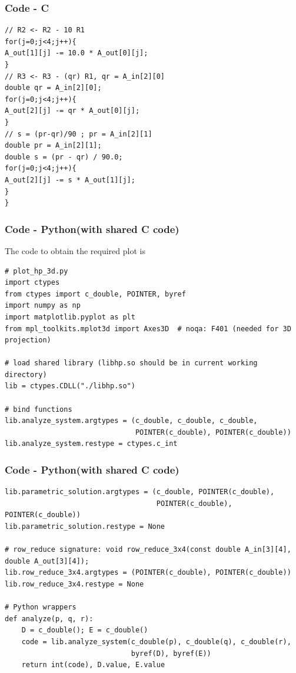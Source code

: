 \documentclass{beamer}
\theoremstyle{remark}
\numberwithin{equation}{section}
\begin{document}
    \begin{frame}[fragile]
    \frametitle{Code - C}
    \begin{lstlisting}
// R2 <- R2 - 10 R1
for(j=0;j<4;j++){
A_out[1][j] -= 10.0 * A_out[0][j];
}
// R3 <- R3 - (qr) R1, qr = A_in[2][0]
double qr = A_in[2][0];
for(j=0;j<4;j++){
A_out[2][j] -= qr * A_out[0][j];
}
// s = (pr-qr)/90 ; pr = A_in[2][1]
double pr = A_in[2][1];
double s = (pr - qr) / 90.0;
for(j=0;j<4;j++){
A_out[2][j] -= s * A_out[1][j];
}
}

\end{lstlisting}
\end{frame}

\begin{frame}[fragile]
    \frametitle{Code - Python(with shared C code)}
    The code to obtain the required plot is
    \begin{lstlisting}
# plot_hp_3d.py
import ctypes
from ctypes import c_double, POINTER, byref
import numpy as np
import matplotlib.pyplot as plt
from mpl_toolkits.mplot3d import Axes3D  # noqa: F401 (needed for 3D projection)

# load shared library (libhp.so should be in current working directory)
lib = ctypes.CDLL("./libhp.so")

# bind functions
lib.analyze_system.argtypes = (c_double, c_double, c_double,
                               POINTER(c_double), POINTER(c_double))
lib.analyze_system.restype = ctypes.c_int

\end{lstlisting}
\end{frame}
\begin{frame}[fragile]
\frametitle{Code - Python(with shared C code)}
\begin{lstlisting}
lib.parametric_solution.argtypes = (c_double, POINTER(c_double),
                                    POINTER(c_double), POINTER(c_double))
lib.parametric_solution.restype = None

# row_reduce signature: void row_reduce_3x4(const double A_in[3][4], double A_out[3][4]);
lib.row_reduce_3x4.argtypes = (POINTER(c_double), POINTER(c_double))
lib.row_reduce_3x4.restype = None

# Python wrappers
def analyze(p, q, r):
    D = c_double(); E = c_double()
    code = lib.analyze_system(c_double(p), c_double(q), c_double(r),
                              byref(D), byref(E))
    return int(code), D.value, E.value
\end{lstlisting}
\end{frame}
\end{document}
